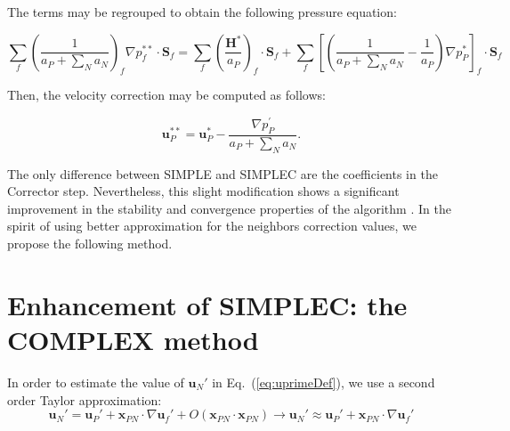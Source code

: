 \documentclass[final,3p,times,10pt,onecolumn]{myElsarticle}
\numberwithin{equation}{section}
\begin{document}
The terms may be regrouped to obtain the following pressure equation:

\begin{equation}\label{eq:pEqnSIMPLEC3}
\sum_f \left(\frac{1}{a_P + \sum_{N} a_{N}}\right)_f \nabla p_f^{**} \cdot \boldsymbol{S}_f= \sum_f \left(\frac{\boldsymbol{H}^*}{a_P}\right)_f \cdot \boldsymbol{S}_f + \sum_f \left[ \left( \frac{1}{a_P + \sum_{N} a_{N}} - \frac{1}{a_P}\right) \nabla p_P^{*}\right]_f \cdot \boldsymbol{S}_f 
\end{equation}

Then, the velocity correction may be computed as follows:

\begin{equation}\label{eq:uCorrSIMPLEC}
\boldsymbol{u}^{**}_P = \boldsymbol{u}_P^* - \frac{\nabla p_P^{'}}{a_P + \sum_{N} a_{N}}.
\end{equation}


The only difference between SIMPLE and SIMPLEC are the coefficients in the Corrector step. Nevertheless, this slight modification shows a significant improvement in the stability  and convergence properties of the algorithm \cite{liu}. In the spirit of using better approximation for the neighbors correction values, we propose the following method.

\section{Enhancement of SIMPLEC: the COMPLEX method}
\label{sec:COMPLEX}

In order to estimate the value of $\boldsymbol{u}_N'$ in Eq.~(\ref{eq:uprimeDef}), we use a second order Taylor approximation:
\begin{equation}\label{eq:uNTaylor}
\boldsymbol{u}_N' = \boldsymbol{u}_P' + \boldsymbol{x}_{PN}\cdot 
\nabla \boldsymbol{u}_f' + \mathcal{}{O}(\boldsymbol{x}_{PN} \cdot \boldsymbol{x}_{PN}) \rightarrow \boldsymbol{u}_N' \approx \boldsymbol{u}_P' + \boldsymbol{x}_{PN}\cdot \nabla \boldsymbol{u}_f'
\end{equation}
\end{document}
